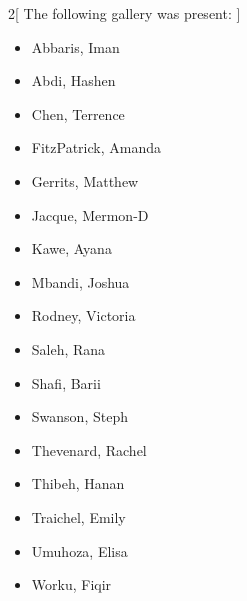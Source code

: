 
\begin{multicols}{2}[
        The following gallery was present:
    ]
\begin{itemize}
    \item Abbaris, Iman
    \item Abdi, Hashen
    \item Chen, Terrence
    \item FitzPatrick, Amanda
    \item Gerrits, Matthew
    \item Jacque, Mermon-D
    \item Kawe, Ayana
    \item Mbandi, Joshua
    \item Rodney, Victoria
    \item Saleh, Rana
    \item Shafi, Barii
    \item Swanson, Steph 
    \item Thevenard, Rachel
    \item Thibeh, Hanan
    \item Traichel, Emily
    \item Umuhoza, Elisa
    \item Worku, Fiqir
\end{itemize}
\end{multicols}

